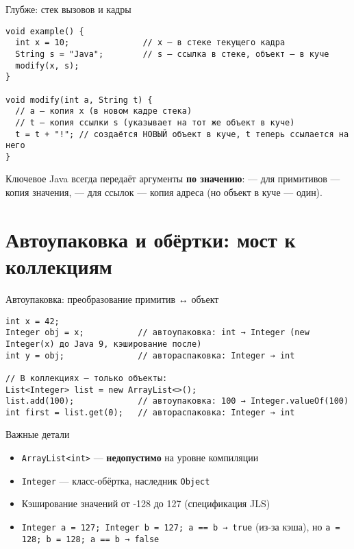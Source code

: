 \documentclass[aspectratio=169]{beamer}
\begin{document}
\begin{frame}[fragile]{Глубже: стек вызовов и кадры}
\lstset{language=JavaLite}
\begin{lstlisting}
void example() {
  int x = 10;               // x — в стеке текущего кадра
  String s = "Java";        // s — ссылка в стеке, объект — в куче
  modify(x, s);
}

void modify(int a, String t) {
  // a — копия x (в новом кадре стека)
  // t — копия ссылки s (указывает на тот же объект в куче)
  t = t + "!"; // создаётся НОВЫЙ объект в куче, t теперь ссылается на него
}
\end{lstlisting}
  \begin{block}{Ключевое}
    Java всегда передаёт аргументы \textbf{по значению}:  
    — для примитивов — копия значения,  
    — для ссылок — копия адреса (но объект в куче — один).
  \end{block}
\end{frame}

\section{Автоупаковка и обёртки: мост к коллекциям}

\begin{frame}[fragile]{Автоупаковка: преобразование примитив ↔ объект}
\lstset{language=JavaLite}
\begin{lstlisting}
int x = 42;
Integer obj = x;           // автоупаковка: int → Integer (new Integer(x) до Java 9, кэширование после)
int y = obj;               // автораспаковка: Integer → int

// В коллекциях — только объекты:
List<Integer> list = new ArrayList<>();
list.add(100);             // автоупаковка: 100 → Integer.valueOf(100)
int first = list.get(0);   // автораспаковка: Integer → int
\end{lstlisting}
  \begin{block}{Важные детали}
    \begin{itemize}
      \item \texttt{ArrayList<int>} — \textbf{недопустимо} на уровне компиляции
      \item \texttt{Integer} — класс-обёртка, наследник \texttt{Object}
      \item Кэширование значений от -128 до 127 (спецификация JLS)
      \item \texttt{Integer a = 127; Integer b = 127; a == b → true} (из-за кэша), но \texttt{a = 128; b = 128; a == b → false}
    \end{itemize}
  \end{block}
\end{frame}
\end{document}
